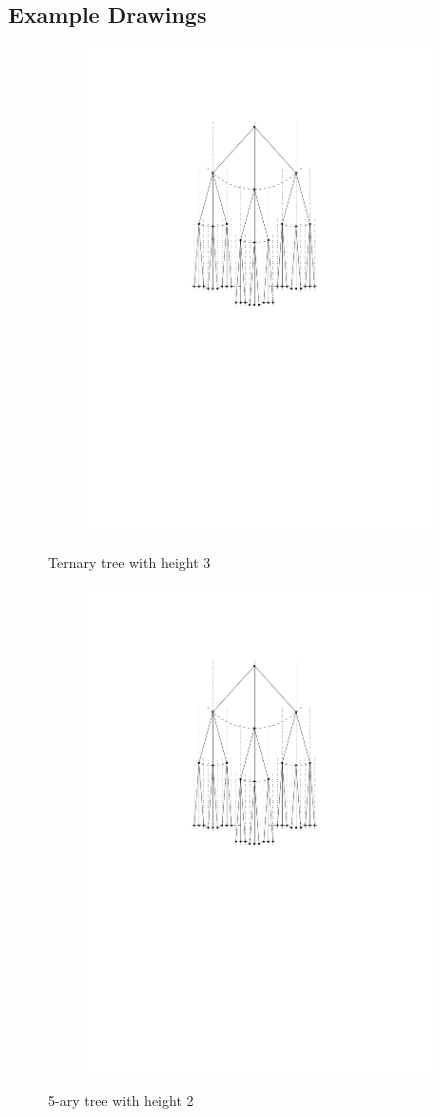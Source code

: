 \subsection{Example Drawings}
\begin{figure}[H]
	\centering
	\begin{subfigure}{\textwidth}
		\centering
		\includegraphics[page=1,width=0.6\linewidth]{graphics/k-ary_tree_example_drawings.pdf}
	\end{subfigure}
	\caption{Ternary tree with height 3}\label{im:3-ary_tree}
\end{figure}
\begin{figure}[H]
	\centering
	\begin{subfigure}{\textwidth}
		\centering
		\includegraphics[page=2,width=0.6\linewidth]{graphics/k-ary_tree_example_drawings.pdf}
	\end{subfigure}
	\caption{5-ary tree with height 2}\label{im:4-ary_tree}
\end{figure}

